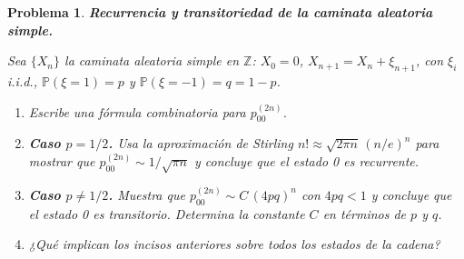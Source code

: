 \documentclass[12pt]{article}
\newtheorem{problem}{Problema}
\begin{document}


%
%

\begin{problem}
\textbf{Recurrencia y transitoriedad de la caminata aleatoria simple.}

Sea $\{X_n\}$ la caminata aleatoria simple en $\mathbb{Z}$: $X_0 = 0$, $X_{n+1} = X_n + \xi_{n+1}$, con $\xi_i$ i.i.d., $\mathbb{P}(\xi = 1) = p$ y $\mathbb{P}(\xi = -1) = q = 1-p$.

\begin{enumerate}
    \item[(a)] Escribe una fórmula combinatoria para $p_{00}^{(2n)}$.

    \item[(b)] \textbf{Caso $p = 1/2$.} Usa la aproximación de Stirling $n! \approx \sqrt{2\pi n}\,(n/e)^n$ para mostrar que $p_{00}^{(2n)} \sim 1/\sqrt{\pi n}$ y concluye que el estado 0 es recurrente.

    \item[(c)] \textbf{Caso $p \ne 1/2$.} Muestra que $p_{00}^{(2n)} \sim C\,(4pq)^n$ con $4pq < 1$ y concluye que el estado 0 es transitorio. Determina la constante $C$ en términos de $p$ y $q$.

    \item[(d)] ¿Qué implican los incisos anteriores sobre \emph{todos} los estados de la cadena?
\end{enumerate}
\end{problem}
\end{document}
